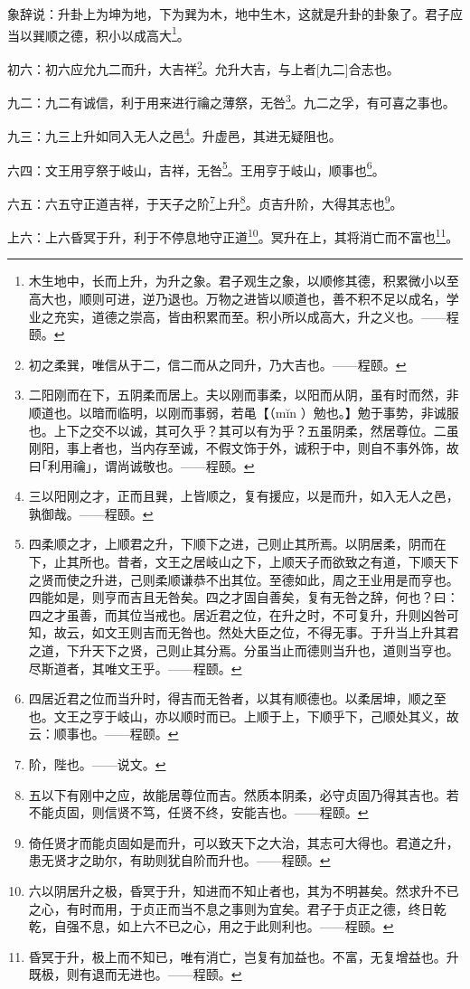 \documentclass[12pt,oneside]{book}
\begin{document}
象辞说：升卦上为坤为地，下为巽为木，地中生木，这就是升卦的卦象了。君子应当以巽顺之德，积小以成高大\footnote{木生地中，长而上升，为升之象。君子观生之象，以顺修其德，积累微小以至高大也，顺则可进，逆乃退也。万物之进皆以顺道也，善不积不足以成名，学业之充实，道德之崇高，皆由积累而至。积小所以成高大，升之义也。——程颐。}。

初六：初六应允九二而升，大吉祥\footnote{初之柔巽，唯信从于二，信二而从之同升，乃大吉也。——程颐。}。允升大吉，与上者[九二]合志也。

九二：九二有诚信，利于用来进行禴之薄祭，无咎\footnote{二阳刚而在下，五阴柔而居上。夫以刚而事柔，以阳而从阴，虽有时而然，非顺道也。以暗而临明，以刚而事弱，若黾【（mĭn ）勉也。】勉于事势，非诚服也。上下之交不以诚，其可久乎？其可以有为乎？五虽阴柔，然居尊位。二虽刚阳，事上者也，当内存至诚，不假文饰于外，诚积于中，则自不事外饰，故曰｢利用禴｣，谓尚诚敬也。——程颐。}。九二之孚，有可喜之事也。

九三：九三上升如同入无人之邑\footnote{三以阳刚之才，正而且巽，上皆顺之，复有援应，以是而升，如入无人之邑，孰御哉。——程颐。}。升虚邑，其进无疑阻也。

六四：文王用亨祭于岐山，吉祥，无咎\footnote{四柔顺之才，上顺君之升，下顺下之进，己则止其所焉。以阴居柔，阴而在下，止其所也。昔者，文王之居岐山之下，上顺天子而欲致之有道，下顺天下之贤而使之升进，己则柔顺谦恭不出其位。至德如此，周之王业用是而亨也。四能如是，则亨而吉且无咎矣。四之才固自善矣，复有无咎之辞，何也？曰：四之才虽善，而其位当戒也。居近君之位，在升之时，不可复升，升则凶咎可知，故云，如文王则吉而无咎也。然处大臣之位，不得无事。于升当上升其君之道，下升天下之贤，己则止其分焉。分虽当止而德则当升也，道则当亨也。尽斯道者，其唯文王乎。——程颐。}。王用亨于岐山，顺事也\footnote{四居近君之位而当升时，得吉而无咎者，以其有顺德也。以柔居坤，顺之至也。文王之亨于岐山，亦以顺时而已。上顺于上，下顺乎下，己顺处其义，故云：顺事也。——程颐。}。

六五：六五守正道吉祥，于天子之阶\footnote{阶，陛也。——说文。}上升\footnote{五以下有刚中之应，故能居尊位而吉。然质本阴柔，必守贞固乃得其吉也。若不能贞固，则信贤不笃，任贤不终，安能吉也。——程颐。}。贞吉升阶，大得其志也\footnote{倚任贤才而能贞固如是而升，可以致天下之大治，其志可大得也。君道之升，患无贤才之助尔，有助则犹自阶而升也。——程颐。}。

上六：上六昏冥于升，利于不停息地守正道\footnote{六以阴居升之极，昏冥于升，知进而不知止者也，其为不明甚矣。然求升不已之心，有时而用，于贞正而当不息之事则为宜矣。君子于贞正之德，终日乾乾，自强不息，如上六不已之心，用之于此则利也。——程颐。}。冥升在上，其将消亡而不富也\footnote{昏冥于升，极上而不知已，唯有消亡，岂复有加益也。不富，无复增益也。升既极，则有退而无进也。——程颐。}。
\end{document}

